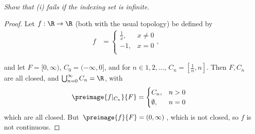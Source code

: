\documentclass[12pt,letterpaper]{article}
\begin{document}
\begin{enumerate}
	\textit{Show that (i) fails if the indexing set is infinite. }
	\begin{proof}
	Let $f:\R\to\R$ (both with the usual topology) be defined by
	\begin{align*}	
	f&=\begin{cases}
	\frac{1}{x}, & x\neq 0 \\
	-1, & x=0 \\
	\end{cases}, & %
	\end{align*}
	
	and let $F=[0,\infty)$, $C_0=(-\infty,0]$, and for $n\in 1, 2, \dots$, $C_n=[\frac{1}{n},n]$. 
	Then $F,C_n$ are all closed, and $\bigcup_{n=0}^\infty C_n = \R$, with 
	$$\preimage{f|_{C_n}}{F}=\begin{cases}
	C_n, & n>0 \\
	\emptyset, & n=0
	\end{cases}
	$$
	which are all closed. But $\preimage{f}{F}=(0,\infty)$, which is not closed, so $f$ is not continuous. 
	\end{proof}


\end{enumerate}
\end{document}
